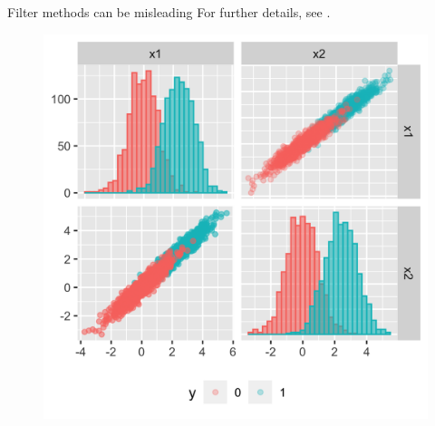 \documentclass[11pt,compress,t,notes=noshow, xcolor=table]{beamer}
\begin{document}
\begin{vbframe}{Filter methods can be misleading}
{For further details, see .}

   \framebreak

     \begin{figure}
    \centering
    \begin{minipage}{0.45\textwidth}
        \centering
        \includegraphics[width=\textwidth]{figure/guyon_example_intra_class_covariance.png} %
    \end{minipage}\hfill
    \begin{minipage}{0.45\textwidth}
        \centering

\end{minipage}
\end{figure}
\end{vbframe}
\end{document}
